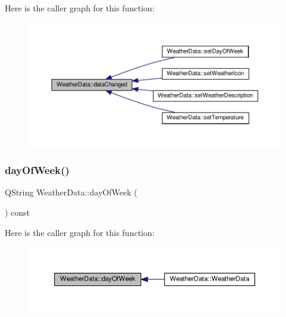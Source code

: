 Here is the caller graph for this function\+:\nopagebreak
\begin{figure}[H]
\begin{center}
\leavevmode
\includegraphics[width=350pt]{class_weather_data_a23185106cf22ef8c57c96154e37b24d1_icgraph}
\end{center}
\end{figure}
\mbox{\label{class_weather_data_a413b0ccf3fad036782ee5f5cb66f9a62}} 
\subsubsection{\texorpdfstring{day\+Of\+Week()}{dayOfWeek()}}
{\footnotesize\ttfamily Q\+String Weather\+Data\+::day\+Of\+Week (\begin{DoxyParamCaption}{ }\end{DoxyParamCaption}) const}

Here is the caller graph for this function\+:\nopagebreak
\begin{figure}[H]
\begin{center}
\leavevmode
\includegraphics[width=350pt]{class_weather_data_a413b0ccf3fad036782ee5f5cb66f9a62_icgraph}
\end{center}
\end{figure}
\mbox{\label{class_weather_data_a0a83b2ee5398eaba062e3c6fe9264a3d}} 
